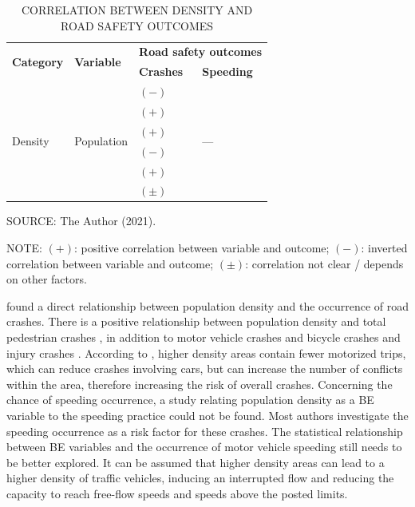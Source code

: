 \begin{table}[!hbtp]
    \footnotesize
    \captionsetup{justification=raggedright,
        singlelinecheck=false,
        font=footnotesize}
    \caption{CORRELATION BETWEEN DENSITY AND ROAD SAFETY OUTCOMES}
    \centering
    \begin{tabular}{llll}
        \hline
        \multirow{2}{*}{\textbf{Category}} & \multirow{2}{*}{\textbf{Variable}} & \multicolumn{2}{c}{\textbf{Road safety outcomes}} \\
         &  & \multicolumn{1}{l}{\textbf{Crashes}} & \multicolumn{1}{l}{\textbf{Speeding}} \\ \hline
        \multirow{6}{*}{Density} & \multirow{6}{*}{Population} & $(-)$ \textcite{Dumbaugh2009} & \multirow{6}{*}{---} \\
         &  & $(+)$ \textcite{Dumbaugh2013} &  \\
         &  & $(+)$ \textcite{Lee2015} &  \\
         &  & $(-)$ \textcite{Obelheiro2020} &  \\
         &  & $(+)$ \textcite{Pirdavani2014} &  \\
         &  & $(\pm)$ \textcite{Welle2016} &  \\ \hline
    \end{tabular}
    \label{tab:density}
    \par \vspace{2mm} \footnotesize \raggedright
    SOURCE: The Author (2021).
    \par \vspace{1mm} \footnotesize \raggedright
    NOTE: $(+)$: positive correlation between variable and outcome; $(-)$: inverted correlation between variable and outcome; $(\pm)$: correlation not clear / depends on other factors.
\end{table}

\textcite{Dumbaugh2013,Lee2015,Pirdavani2014} found a direct relationship between population density and the occurrence of road crashes. There is a positive relationship between population density and total pedestrian crashes \cite{Dumbaugh2013}, in addition to motor vehicle crashes and bicycle crashes \cite{Lee2015} and injury crashes \cite{Pirdavani2014}. According to \textcite{Welle2016}, higher density areas contain fewer motorized trips, which can reduce crashes involving cars, but can increase the number of conflicts within the area, therefore increasing the risk of overall crashes. Concerning the chance of speeding occurrence, a study relating population density as a BE variable to the speeding practice could not be found. Most authors investigate the speeding occurrence as a risk factor for these crashes. The statistical relationship between BE variables and the occurrence of motor vehicle speeding still needs to be better explored. It can be assumed that higher density areas can lead to a higher density of traffic vehicles, inducing an interrupted flow and reducing the capacity to reach free-flow speeds and speeds above the posted limits.

